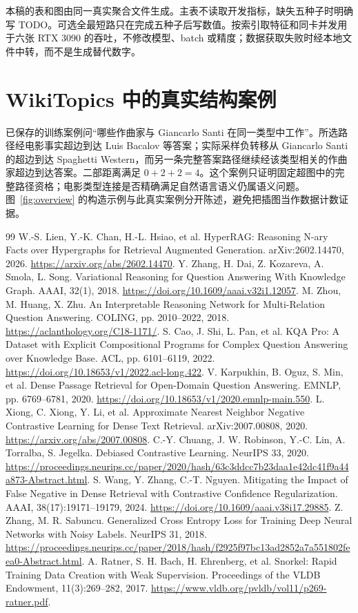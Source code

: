 \documentclass[UTF8,a4paper,10pt,fontset=fandol]{ctexart}
\begin{document}
本稿的表和图由同一真实聚合文件生成。主表不读取开发指标，缺失五种子时明确写 TODO。可选全最短路只在完成五种子后写数值。按索引取特征和同卡并发用于六张 RTX 3090 的吞吐，不修改模型、batch 或精度；数据获取失败时经本地文件中转，而不是生成替代数字。

\section{WikiTopics 中的真实结构案例}
已保存的训练案例问“哪些作曲家与 Giancarlo Santi 在同一类型中工作”。所选路径经电影事实超边到达 Luis Bacalov 等答案；实际采样负转移从 Giancarlo Santi 的超边到达 Spaghetti Western，而另一条完整答案路径继续经该类型相关的作曲家超边到达答案。二部距离满足 $0+2+2=4$。这个案例只证明固定超图中的完整路径资格；电影类型连接是否精确满足自然语言语义仍属语义问题。图~\ref{fig:overview} 的构造示例与此真实案例分开陈述，避免把插图当作数据计数证据。

\begin{thebibliography}{99}
 W.-S. Lien, Y.-K. Chan, H.-L. Hsiao, et al. HyperRAG: Reasoning N-ary Facts over Hypergraphs for Retrieval Augmented Generation. arXiv:2602.14470, 2026. \url{https://arxiv.org/abs/2602.14470}.
 Y. Zhang, H. Dai, Z. Kozareva, A. Smola, L. Song. Variational Reasoning for Question Answering With Knowledge Graph. AAAI, 32(1), 2018. \url{https://doi.org/10.1609/aaai.v32i1.12057}.
 M. Zhou, M. Huang, X. Zhu. An Interpretable Reasoning Network for Multi-Relation Question Answering. COLING, pp. 2010--2022, 2018. \url{https://aclanthology.org/C18-1171/}.
 S. Cao, J. Shi, L. Pan, et al. KQA Pro: A Dataset with Explicit Compositional Programs for Complex Question Answering over Knowledge Base. ACL, pp. 6101--6119, 2022. \url{https://doi.org/10.18653/v1/2022.acl-long.422}.
 V. Karpukhin, B. Oguz, S. Min, et al. Dense Passage Retrieval for Open-Domain Question Answering. EMNLP, pp. 6769--6781, 2020. \url{https://doi.org/10.18653/v1/2020.emnlp-main.550}.
 L. Xiong, C. Xiong, Y. Li, et al. Approximate Nearest Neighbor Negative Contrastive Learning for Dense Text Retrieval. arXiv:2007.00808, 2020. \url{https://arxiv.org/abs/2007.00808}.
 C.-Y. Chuang, J. W. Robinson, Y.-C. Lin, A. Torralba, S. Jegelka. Debiased Contrastive Learning. NeurIPS 33, 2020. \url{https://proceedings.neurips.cc/paper/2020/hash/63c3ddcc7b23daa1e42dc41f9a44a873-Abstract.html}.
 S. Wang, Y. Zhang, C.-T. Nguyen. Mitigating the Impact of False Negative in Dense Retrieval with Contrastive Confidence Regularization. AAAI, 38(17):19171--19179, 2024. \url{https://doi.org/10.1609/aaai.v38i17.29885}.
 Z. Zhang, M. R. Sabuncu. Generalized Cross Entropy Loss for Training Deep Neural Networks with Noisy Labels. NeurIPS 31, 2018. \url{https://proceedings.neurips.cc/paper/2018/hash/f2925f97bc13ad2852a7a551802feea0-Abstract.html}.
 A. Ratner, S. H. Bach, H. Ehrenberg, et al. Snorkel: Rapid Training Data Creation with Weak Supervision. Proceedings of the VLDB Endowment, 11(3):269--282, 2017. \url{https://www.vldb.org/pvldb/vol11/p269-ratner.pdf}.
\end{thebibliography}
\end{document}

